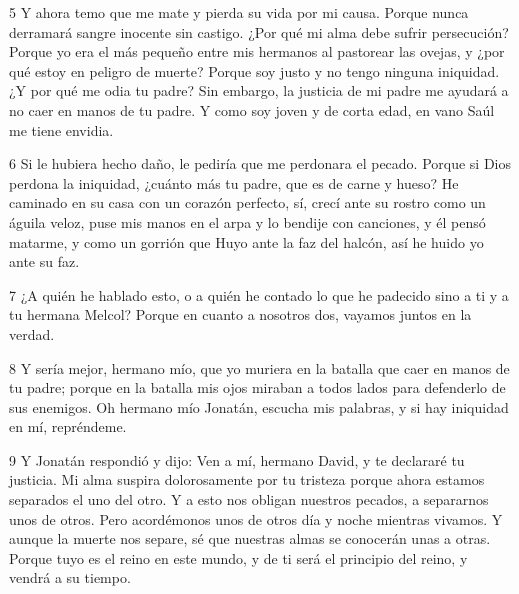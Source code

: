 \par 5 Y ahora temo que me mate y pierda su vida por mi causa. Porque nunca derramará sangre inocente sin castigo. ¿Por qué mi alma debe sufrir persecución? Porque yo era el más pequeño entre mis hermanos al pastorear las ovejas, y ¿por qué estoy en peligro de muerte? Porque soy justo y no tengo ninguna iniquidad. ¿Y por qué me odia tu padre? Sin embargo, la justicia de mi padre me ayudará a no caer en manos de tu padre. Y como soy joven y de corta edad, en vano Saúl me tiene envidia.

\par 6 Si le hubiera hecho daño, le pediría que me perdonara el pecado. Porque si Dios perdona la iniquidad, ¿cuánto más tu padre, que es de carne y hueso? He caminado en su casa con un corazón perfecto, sí, crecí ante su rostro como un águila veloz, puse mis manos en el arpa y lo bendije con canciones, y él pensó matarme, y como un gorrión que Huyo ante la faz del halcón, así he huido yo ante su faz.

\par 7 ¿A quién he hablado esto, o a quién he contado lo que he padecido sino a ti y a tu hermana Melcol? Porque en cuanto a nosotros dos, vayamos juntos en la verdad.

\par 8 Y sería mejor, hermano mío, que yo muriera en la batalla que caer en manos de tu padre; porque en la batalla mis ojos miraban a todos lados para defenderlo de sus enemigos. Oh hermano mío Jonatán, escucha mis palabras, y si hay iniquidad en mí, repréndeme.

\par 9 Y Jonatán respondió y dijo: Ven a mí, hermano David, y te declararé tu justicia. Mi alma suspira dolorosamente por tu tristeza porque ahora estamos separados el uno del otro. Y a esto nos obligan nuestros pecados, a separarnos unos de otros. Pero acordémonos unos de otros día y noche mientras vivamos. Y aunque la muerte nos separe, sé que nuestras almas se conocerán unas a otras. Porque tuyo es el reino en este mundo, y de ti será el principio del reino, y vendrá a su tiempo.

